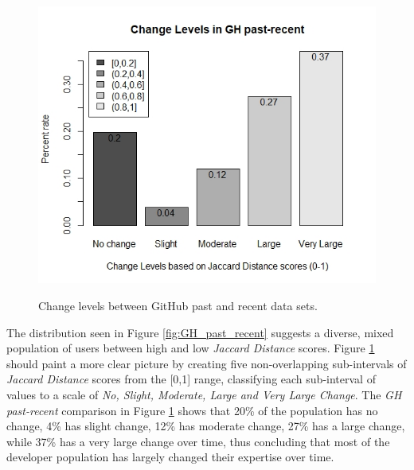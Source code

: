         \begin{figure}
          \centering
          \includegraphics[width=\textwidth]{figures/change_level_GH_past-recent.jpeg}\\
          \caption{Change levels between GitHub past and recent data sets.}
          \label{fig:change_GH_past_recent}
        \end{figure}
        
        The distribution seen in Figure \ref{fig:GH_past_recent} suggests a diverse, mixed population of users between high and low \emph{Jaccard Distance} scores. Figure \ref{fig:change_GH_past_recent} should paint a more clear picture by creating five non-overlapping sub-intervals of \emph{Jaccard Distance} scores from the [0,1] range, classifying each sub-interval of values to a scale of \emph{No, Slight, Moderate, Large and Very Large Change}. The \emph{GH past-recent} comparison in Figure \ref{fig:change_GH_past_recent} shows that 20\% of the population has no change, 4\% has slight change, 12\% has moderate change, 27\% has a large change, while 37\% has a very large change over time, thus concluding that most of the developer population has largely changed their expertise over time. 
        
